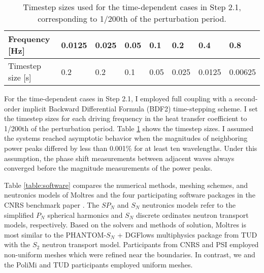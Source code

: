 \begin{table}[tb]
    \caption{Timestep sizes used for the time-dependent cases in
    Step 2.1, corresponding to 1/200th of the perturbation period.}
	\centering
	\setlength\tabcolsep{2.5pt}
	\begin{tabular}{l l l l l l l l}
	    \toprule
	    Frequency [Hz] & 0.0125 & 0.025 & 0.05 & 0.1 & 0.2 & 0.4 & 0.8 \\
	    \midrule
	    Timestep size [s] & 0.2 & 0.2 & 0.1 & 0.05 & 0.025 & 0.0125 & 0.00625
	    \\
	    \bottomrule
	\end{tabular}
	\label{table:timestep}
\end{table}

For the time-dependent cases in Step 2.1, I employed full coupling with
a second-order implicit Backward Differential Formula (BDF2) time-stepping
scheme. I set the timestep sizes for each driving frequency in the heat transfer
coefficient to 1/200th of the perturbation period. Table
\ref{table:timestep} shows the timestep sizes. I assumed the
systems reached asymptotic behavior when the magnitudes of neighboring power
peaks differed by less than 0.001\% for at least ten wavelengths. Under this
assumption, the phase shift measurements between adjacent waves always
converged before the magnitude measurements of the power peaks.

Table \ref{table:software} compares the numerical methods, meshing schemes, and
neutronics models of Moltres and the four participating software packages in
the CNRS benchmark paper \cite{tiberga_results_2020}. The $SP_N$ and
$S_N$ neutronics models refer to the simplified $P_N$ spherical harmonics and
$S_N$ discrete ordinates neutron transport models, respectively. Based on the
solvers and methods of solution, Moltres is most similar to the
PHANTOM-$S_N$ + DGFlows \cite{tiberga_discontinuous_2019} multiphysics package
from \gls{TUD} with the $S_2$ neutron transport model. Participants from
\gls{CNRS} and \gls{PSI}
employed non-uniform meshes which were refined near the boundaries. In contrast,
we and the \gls{PoliMi} and \gls{TUD} participants employed uniform meshes.

\FloatBarrier

